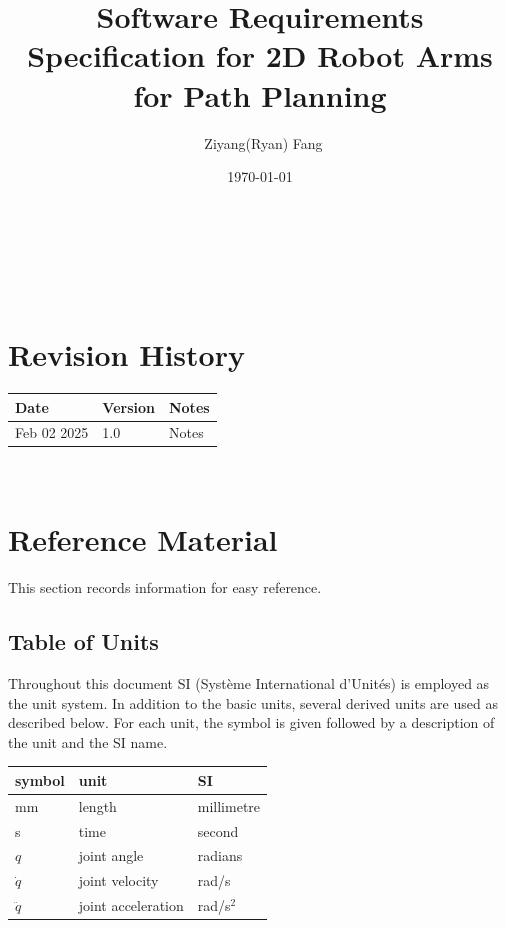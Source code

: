 \documentclass[12pt]{article}
\begin{document}
\title{Software Requirements Specification for 2D Robot Arms for Path Planning} 
\author{\ Ziyang(Ryan) Fang}
\date{\today}
	
\maketitle

~\newpage


\tableofcontents

~\newpage

\section*{Revision History}

\begin{tabularx}{\textwidth}{p{3cm}p{2cm}X}
\toprule {\bf Date} & {\bf Version} & {\bf Notes}\\
\midrule
Feb 02 2025 & 1.0 & Notes\\
\bottomrule
\end{tabularx}



~\newpage

\section{Reference Material}

This section records information for easy reference.

\subsection{Table of Units}

Throughout this document SI (Syst\`{e}me International d'Unit\'{e}s) is employed
as the unit system.  In addition to the basic units, several derived units are
used as described below.  For each unit, the symbol is given followed by a
description of the unit and the SI name.
~\newline

\renewcommand{\arraystretch}{1.2}
  \noindent \begin{tabular}{l l l} 
    \toprule		
    \textbf{symbol} & \textbf{unit} & \textbf{SI}\\
    \midrule 
    \si{\milli\metre} & length & millimetre \\
    \si{\second} & time & second \\
    \( q \) & joint angle & radians \\
    \(\dot{q}\) & joint velocity & rad/s \\
    \(\ddot{q}\) & joint acceleration & rad/s\(^2\)  \\
    \bottomrule
  \end{tabular}
\end{document}
